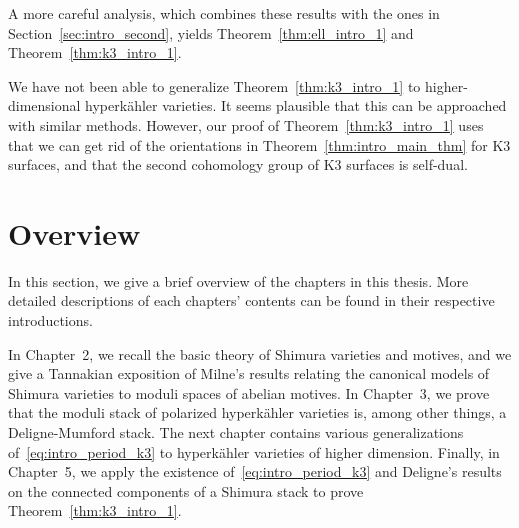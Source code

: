 A more careful analysis, which combines these results with the ones in Section~\ref{sec:intro_second}, yields Theorem~\ref{thm:ell_intro_1} and Theorem~\ref{thm:k3_intro_1}.

We have not been able to generalize Theorem~\ref{thm:k3_intro_1} to higher-dimensional hyperk\"ahler varieties. It seems plausible that this can be approached with similar methods. However, our proof of Theorem~\ref{thm:k3_intro_1} uses that we can get rid of the orientations in Theorem~\ref{thm:intro_main_thm} for K3 surfaces, and that the second cohomology group of K3 surfaces is self-dual. 

\section{Overview}
In this section, we give a brief overview of the chapters in this thesis. More detailed descriptions of each chapters' contents can be found in their respective introductions.

In Chapter~2, we recall the basic theory of Shimura varieties and motives, and we give a Tannakian exposition of Milne's results relating the canonical models of Shimura varieties to moduli spaces of abelian motives. In Chapter~3, we prove that the moduli stack of polarized hyperk\"ahler varieties is, among other things, a Deligne-Mumford stack. The next chapter contains various generalizations of~\eqref{eq:intro_period_k3} to hyperk\"ahler varieties of higher dimension. Finally, in Chapter~5, we apply the existence of~\eqref{eq:intro_period_k3} and Deligne's results on the connected components of a Shimura stack to prove Theorem~\ref{thm:k3_intro_1}.

